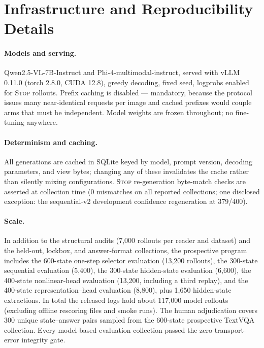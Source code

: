 \documentclass[10pt]{article}
\begin{document}
\section{Infrastructure and Reproducibility Details}
\label{sec:infra}

\paragraph{Models and serving.}
Qwen2.5-VL-7B-Instruct and Phi-4-multimodal-instruct, served with vLLM
0.11.0 (torch 2.8.0, CUDA 12.8), greedy decoding, fixed seed, logprobs
enabled for \textsc{Stop} rollouts. Prefix caching is disabled ---
mandatory, because the protocol issues many near-identical requests per
image and cached prefixes would couple arms that must be independent.
Model weights are frozen throughout; no fine-tuning anywhere.

\paragraph{Determinism and caching.}
All generations are cached in SQLite keyed by model, prompt version,
decoding parameters, and view bytes; changing any of these invalidates the
cache rather than silently mixing configurations. \textsc{Stop}
re-generation byte-match checks are asserted at collection time (0
mismatches on all reported collections; one disclosed exception: the
sequential-v2 development confidence regeneration at 379/400).

\paragraph{Scale.}
In addition to the structural audits (7,000 rollouts per reader and
dataset) and the held-out, lockbox, and answer-format collections, the
prospective program includes the 600-state one-step selector evaluation
(13,200 rollouts), the 300-state sequential evaluation (5,400), the
300-state hidden-state evaluation (6,600), the 400-state nonlinear-head
evaluation (13,200, including a third replay), and the 400-state
representation--head evaluation (8,800), plus 1,650 hidden-state
extractions. In total the released logs hold about 117,000 model rollouts
(excluding offline rescoring files and smoke runs). The human adjudication
covers 300 unique state--answer pairs sampled from the 600-state prospective
TextVQA collection. Every model-based evaluation collection passed the
zero-transport-error integrity gate.
\end{document}
